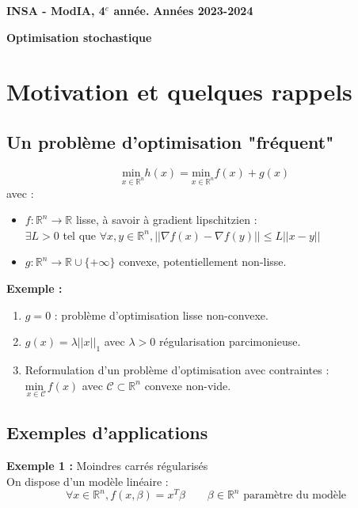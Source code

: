 \documentclass[12pt,a4paper]{article}
\newcommand{\entete}{
    \noindent\textbf{INSA - ModIA, 4$^e$ année.}
    \hfill \textbf{Années 2023-2024}
    
    \begin{center}
        \textbf{\LARGE Optimisation stochastique}
    \end{center}
}
\begin{document}
\entete

\vspace{0.5cm}




\section{Motivation et quelques rappels}

\subsection{Un problème d'optimisation "fréquent"}

\begin{equation}
    \underset{x \in \mathbb{R}^n}{\text{min }} h(x) = \underset{x \in \mathbb{R}^n}{\text{min }} f(x) + g(x)
\end{equation}
avec :
\begin{itemize}
    \item $f : \mathbb{R}^n \rightarrow \mathbb{R}$ lisse, à savoir à gradient lipschitzien :\\
    $\exists L > 0$ tel que $\forall x, y \in \mathbb{R}^n, ||\nabla f(x) - \nabla f(y)|| \leq L ||x - y||$
    \item $g : \mathbb{R}^n \rightarrow \mathbb{R} \cup \{+\infty\}$ convexe, potentiellement non-lisse.\\
\end{itemize}

\textbf{Exemple :}
\begin{enumerate}[label=\roman*)]
    \item $g = 0$ : problème d'optimisation lisse non-convexe.
    \item $g(x) = \lambda ||x||_1$ avec $\lambda > 0$ régularisation parcimonieuse.
    \item Reformulation d'un problème d'optimisation avec contraintes :\\
    $\underset{x \in \mathcal{C}}{\text{min }} f(x)$ avec $\mathcal{C} \subset \mathbb{R}^n$ convexe non-vide.\\
\end{enumerate}


\subsection{Exemples d'applications}

\textbf{Exemple 1 :} Moindres carrés régularisés\\
On dispose d'un modèle linéaire :
$$
\forall x \in \mathbb{R}^n, f(x, \beta) = x^T \beta \quad \quad \beta \in \mathbb{R}^n \text{ paramètre du modèle}
$$
\end{document}
